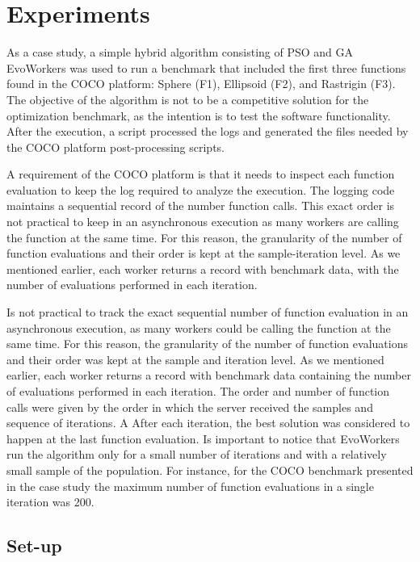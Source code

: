 \section{Experiments}
 \label{sec:experiments}
As a case study, a simple hybrid algorithm consisting 
of PSO and GA EvoWorkers was used to run a benchmark that 
included the first three functions found in the COCO platform:  
Sphere (F1), Ellipsoid (F2), and Rastrigin (F3). The objective 
of the algorithm is not to be a competitive solution for 
the optimization benchmark, as the intention is to test 
the software functionality. After the 
execution, a script processed the logs and generated the files 
needed by the COCO platform post-processing scripts. 

A requirement of the COCO platform is that it needs 
to inspect each function evaluation to keep the log required 
to analyze the execution. The logging code maintains 
a sequential record of the number function calls. 
This exact order is not practical to keep in an asynchronous 
execution as many workers are calling the function at the 
same time. For this reason, the granularity of the number of 
function evaluations and their order is kept at the 
sample-iteration level. As we mentioned earlier, each worker 
returns a record with benchmark data, with the number of 
evaluations performed in each iteration.

Is not practical to track the exact sequential number 
of function evaluation in an asynchronous execution, 
as many workers could be calling the function at the same 
time. For this reason, the granularity of the number of 
function evaluations and their order was kept at the sample 
and iteration level. As we mentioned earlier, each worker returns
a record with benchmark data containing the number of 
evaluations performed in each iteration. The order and number 
of function calls were given by the order in which 
the server received the samples and sequence of iterations.
A After each iteration, the best solution was considered 
to happen at the last function evaluation. Is important to
notice that EvoWorkers run the algorithm only for a small 
number of iterations and with a relatively small sample of 
the population. For instance, for the COCO benchmark 
presented in the case study the maximum number of 
function evaluations in a single iteration was 200. 
  

\subsection{Set-up}
\label{sec:evoworkers}

